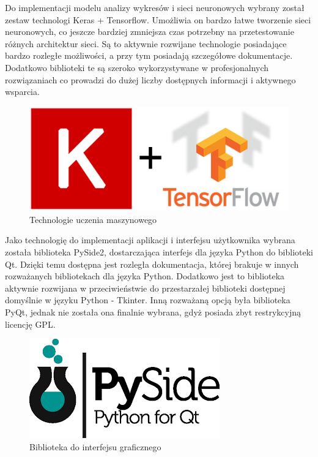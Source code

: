 \documentclass[polish,12pt]{aghthesis}
\begin{document}
Do implementacji modelu analizy wykresów i sieci neuronowych wybrany został zestaw technologi Keras + Tensorflow. Umożliwia on bardzo łatwe tworzenie sieci neuronowych, co jeszcze bardziej zmniejsza czas potrzebny na przetestowanie różnych architektur sieci. Są to aktywnie rozwijane technologie posiadające bardzo rozległe możliwości, a przy tym posiadają szczegółowe dokumentacje. Dodatkowo biblioteki te są szeroko wykorzystywane w profesjonalnych rozwiązaniach co prowadzi do dużej liczby dostępnych informacji i aktywnego wsparcia.

\begin{figure}[h!]
	\centering
	\includegraphics[width=0.8\linewidth]{keras-tensor.jpg}
	\caption{Technologie uczenia maszynowego}
	\label{fig:kt}
\end{figure}

Jako technologię do implementacji aplikacji i interfejsu użytkownika wybrana została biblioteka PySide2, dostarczająca interfejs dla języka Python do biblioteki Qt. Dzięki temu dostępna jest rozległa dokumentacja, której brakuje w innych rozważanych bibliotekach dla języka Python. Dodatkowo jest to biblioteka aktywnie rozwijana w przeciwieństwie do przestarzałej biblioteki dostępnej domyślnie w języku Python - Tkinter. Inną rozważaną opcją była biblioteka PyQt, jednak nie została ona finalnie wybrana, gdyż posiada zbyt restrykcyjną licencję GPL.

\begin{figure}[h!]
	\centering
	\includegraphics[width=0.6\linewidth]{pyside.jpg}
	\caption{Biblioteka do interfejsu graficznego}
	\label{fig:pyside}
\end{figure}
\end{document}
